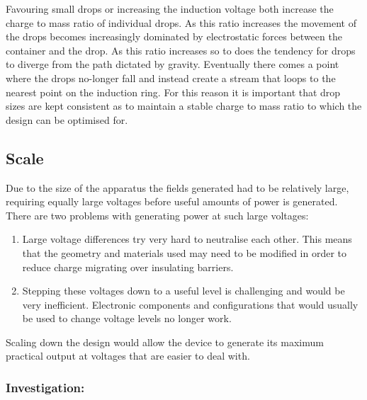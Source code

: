 Favouring small drops or increasing the induction voltage both increase
the charge to mass ratio of individual drops. As this ratio increases
the movement of the drops becomes increasingly dominated by electrostatic
forces between the container and the drop. As this ratio increases
so to does the tendency for drops to diverge from the path dictated
by gravity. Eventually there comes a point where the drops no-longer
fall and instead create a stream that loops to the nearest point on
the induction ring. For this reason it is important that drop sizes
are kept consistent as to maintain a stable charge to mass ratio to
which the design can be optimised for.


\subsection{Scale}

Due to the size of the apparatus the fields generated had to be relatively
large, requiring equally large voltages before useful amounts of power
is generated. There are two problems with generating power at such
large voltages:
\begin{enumerate}
\item Large voltage differences try very hard to neutralise each other.
This means that the geometry and materials used may need to be modified
in order to reduce charge migrating over insulating barriers.
\item Stepping these voltages down to a useful level is challenging and
would be very inefficient. Electronic components and configurations
that would usually be used to change voltage levels no longer work.
\end{enumerate}
Scaling down the design would allow the device to generate its maximum
practical output at voltages that are easier to deal with.


\subsubsection*{Investigation:}

